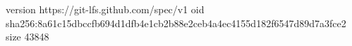 version https://git-lfs.github.com/spec/v1
oid sha256:8a61c15dbccfb694d1dfb4e1cb2b88e2ceb4a4ec4155d182f6547d89d7a3fce2
size 43848
